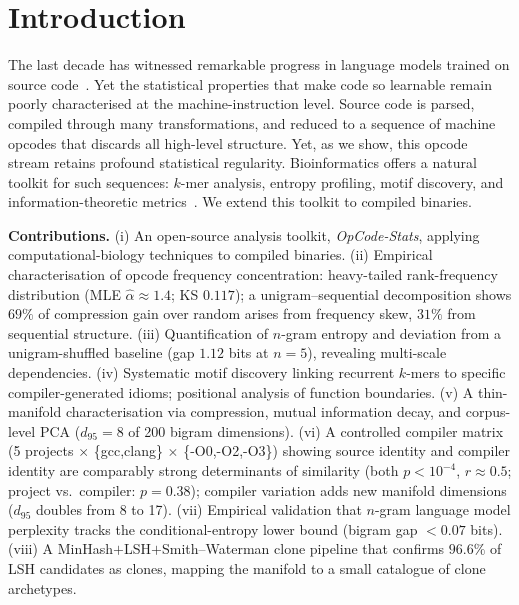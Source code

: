 \documentclass[conference]{IEEEtran}
\begin{document}
\section{Introduction}
\label{sec:intro}

The last decade has witnessed remarkable progress in language models trained
on source code~\cite{chen2021codex,austin2021program}.  Yet the statistical
properties that make code so learnable remain poorly characterised at the
machine-instruction level.  Source code is parsed, compiled through many
transformations, and reduced to a sequence of machine opcodes that discards
all high-level structure.  Yet, as we show, this opcode stream retains
profound statistical regularity.  Bioinformatics offers a natural toolkit for
such sequences: $k$-mer analysis, entropy profiling, motif discovery, and
information-theoretic metrics~\cite{vinga2003alignment}.  We extend this
toolkit to compiled binaries.

\textbf{Contributions.}
(i) An open-source analysis toolkit, \emph{OpCode-Stats}, applying
computational-biology techniques to compiled binaries.
(ii) Empirical characterisation of opcode frequency concentration:
heavy-tailed rank-frequency distribution
(MLE $\hat{\alpha}{\approx}1.4$; KS $0.117$); a unigram--sequential
decomposition shows $69\%$ of compression gain over random arises from
frequency skew, $31\%$ from sequential structure.
(iii) Quantification of $n$-gram entropy and deviation from a
unigram-shuffled baseline (gap $1.12$ bits at $n{=}5$), revealing
multi-scale dependencies.
(iv) Systematic motif discovery linking recurrent $k$-mers to specific
compiler-generated idioms; positional analysis of function boundaries.
(v) A thin-manifold characterisation via compression, mutual information
decay, and corpus-level PCA ($d_{95}{=}8$ of 200 bigram dimensions).
(vi) A controlled compiler matrix
(5 projects $\times$ \{gcc,clang\} $\times$ \{-O0,-O2,-O3\}) showing
source identity and compiler identity are comparably strong determinants
of similarity (both $p{<}10^{-4}$, $r{\approx}0.5$;
project vs.\ compiler: $p{=}0.38$); compiler variation adds new manifold
dimensions ($d_{95}$ doubles from 8 to 17).
(vii) Empirical validation that $n$-gram language model perplexity tracks
the conditional-entropy lower bound (bigram gap ${<}0.07$ bits).
(viii) A MinHash$+$LSH$+$Smith--Waterman clone pipeline that confirms
$96.6\%$ of LSH candidates as clones, mapping the manifold to a small
catalogue of clone archetypes.
\end{document}
